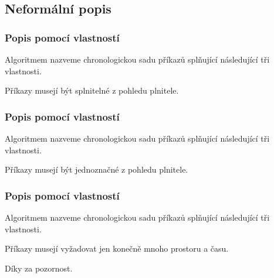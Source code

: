 \documentclass[aspectratio=169,11pt]{beamer}
\begin{document}
\subsection[Neformální popis]{Neformální popis}

\begin{frame}
 \frametitle{Popis pomocí vlastností}
 Algoritmem nazveme \alert{chronologickou sadu příkazů} splňující
 následující tři vlastnosti.
 \pause
 \begin{tcolorbox}[title=Vlastnost 1: splnitelnost,width=.8\textwidth,center]
  Příkazy musejí být splnitelné \alert{z pohledu plnitele}.
 \end{tcolorbox}
\end{frame}

\begin{frame}
 \frametitle{Popis pomocí vlastností}
 Algoritmem nazveme \alert{chronologickou sadu příkazů} splňující
 následující tři vlastnosti.
 \begin{tcolorbox}[title=Vlastnost 2: jednoznačnost,width=.8\textwidth,center]
  Příkazy musejí být jednoznačné \alert{z pohledu plnitele}.
 \end{tcolorbox}
\end{frame}

\begin{frame}
 \frametitle{Popis pomocí vlastností}
 Algoritmem nazveme \alert{chronologickou sadu příkazů} splňující
 následující tři vlastnosti.
 \begin{tcolorbox}[title=Vlastnost 3: konečnost,width=.8\textwidth,center]
  Příkazy musejí vyžadovat jen konečně mnoho prostoru a času.
 \end{tcolorbox}
\end{frame}

\begin{frame}
 \centering\Huge Díky za pozornost.
\end{frame}
\end{document}
